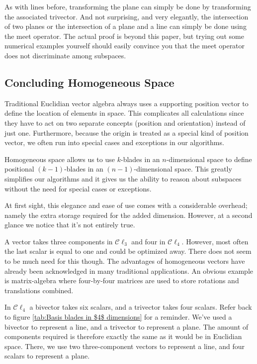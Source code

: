 \documentclass[10pt]{report}
\begin{document}
As with lines before, transforming the plane can simply be done by
transforming the associated trivector. And not surprising, and
very elegantly, the intersection of two planes or the intersection
of a plane and a line can simply be done using the meet operator.
The actual proof is beyond this paper, but trying out some
numerical examples yourself should easily convince you that the
meet operator does not discriminate among subspaces.

\subsection{Concluding Homogeneous Space}

Traditional Euclidian vector algebra always uses a supporting
position vector to define the location of elements in space. This
complicates all calculations since they have to act on two
separate concepts (position and orientation) instead of just one.
Furthermore, because the origin is treated as a special kind of
position vector, we often run into special cases and exceptions in
our algorithms.

Homogeneous space allows us to use $k$-blades in an
$n$-dimensional space to define positional $(k-1)$-blades in an
$(n-1)$-dimensional space. This greatly simplifies our algorithms
and it gives us the ability to reason about subspaces without the
need for special cases or exceptions.

At first sight, this elegance and ease of use comes with a
considerable overhead; namely the extra storage required for the
added dimension. However, at a second glance we notice that it's
not entirely true.

A vector takes three components in $\mathcal{C}\ell_3$ and four in
$\mathcal{C}\ell_4$. However, most often the last scalar is equal
to one and could be optimized away. There does not seem to be much
need for this though. The advantages of homogeneous vectors have
already been acknowledged in many traditional applications. An
obvious example is matrix-algebra where four-by-four matrices are
used to store rotations and translations combined.

In $\mathcal{C}\ell_4$ a bivector takes six scalars, and a
trivector takes four scalars. Refer back to figure \ref{tab:Basis
blades in $4$ dimensions} for a reminder. We've used a bivector to
represent a line, and a trivector to represent a plane. The amount
of components required is therefore exactly the same as it would
be in Euclidian space. There, we use two three-component vectors
to represent a line, and four scalars to represent a plane.
\end{document}
